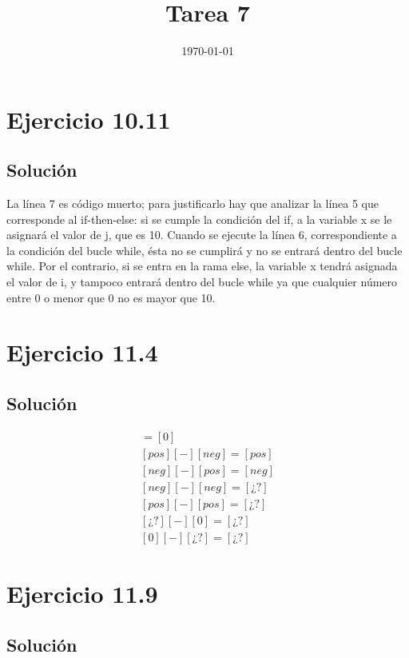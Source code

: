 \documentclass[11pt, a4paper, titlepage]{article}
\begin{document}
\title{Tarea 7}
\date{\today}
\maketitle
\newpage

\section*{Ejercicio 10.11}
\subsection*{Solución}

La línea 7 es código muerto; para justificarlo hay que analizar la línea 5 que
corresponde al if-then-else: si se cumple la condición del if, a la variable x
se le asignará el valor de j, que es 10. Cuando se ejecute la línea 6, correspondiente
a la condición del bucle while, ésta no se cumplirá y no se entrará dentro del bucle
while. Por el contrario, si se entra en la rama else, la variable x tendrá asignada
el valor de i, y tampoco entrará dentro del bucle while ya que cualquier número
entre 0 o menor que 0 no es mayor que 10.

\section*{Ejercicio 11.4}
\subsection*{Solución}
\begin{align*}
  [0] [-] [0] = [0]\\
  [pos] [-] [neg] = [pos]\\
  [neg] [-] [pos] = [neg]\\
  [neg] [-] [neg] = [¿?]\\
  [pos] [-] [pos] = [¿?]\\
  [¿?] [-] [0] = [¿?]\\
  [0] [-] [¿?] = [¿?]
\end{align*}

\section*{Ejercicio 11.9}
\subsection*{Solución}
\end{document}
